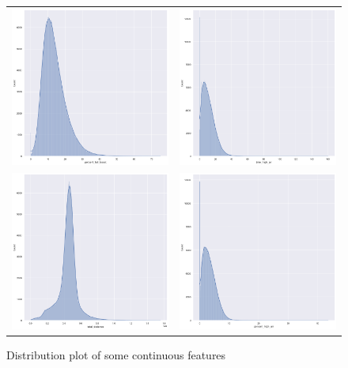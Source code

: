 \begin{figure}[H]
    \centering
    \begin{tabular}{cc}
        \includegraphics[width=0.5\linewidth]{res/imgs/plots/perrcent_boost.png} &
        \includegraphics[width=0.5\linewidth]{res/imgs/plots/time.png} \\
        \includegraphics[width=0.5\linewidth]{res/imgs/plots/distance.png} &
        \includegraphics[width=0.5\linewidth]{res/imgs/plots/high_air.png} \\
    \end{tabular}
    \caption{Distribution plot of some continuous features}
    \label{fig:cat_features}
\end{figure}

